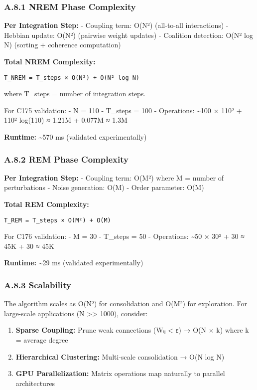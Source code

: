 \documentclass[
]{article}
\providecommand{\tightlist}{%
  \setlength{\itemsep}{0pt}\setlength{\parskip}{0pt}}
\begin{document}
\subsubsection{A.8.1 NREM Phase
Complexity}\label{a.8.1-nrem-phase-complexity}

\textbf{Per Integration Step:} - Coupling term: O(N²) (all-to-all
interactions) - Hebbian update: O(N²) (pairwise weight updates) -
Coalition detection: O(N² log N) (sorting + coherence computation)

\textbf{Total NREM Complexity:}

\begin{verbatim}
T_NREM = T_steps × O(N²) + O(N² log N)
\end{verbatim}

where T\_steps = number of integration steps.

For C175 validation: - N = 110 - T\_steps = 100 - Operations:
\textasciitilde100 × 110² + 110² log(110) ≈ 1.21M + 0.077M ≈ 1.3M

\textbf{Runtime:} \textasciitilde570 ms (validated experimentally)

\subsubsection{A.8.2 REM Phase
Complexity}\label{a.8.2-rem-phase-complexity}

\textbf{Per Integration Step:} - Coupling term: O(M²) where M = number
of perturbations - Noise generation: O(M) - Order parameter: O(M)

\textbf{Total REM Complexity:}

\begin{verbatim}
T_REM = T_steps × O(M²) + O(M)
\end{verbatim}

For C176 validation: - M = 30 - T\_steps = 50 - Operations:
\textasciitilde50 × 30² + 30 ≈ 45K + 30 ≈ 45K

\textbf{Runtime:} \textasciitilde29 ms (validated experimentally)

\subsubsection{A.8.3 Scalability}\label{a.8.3-scalability}

The algorithm scales as O(N²) for consolidation and O(M²) for
exploration. For large-scale applications (N \textgreater\textgreater{}
1000), consider:

\begin{enumerate}
\def\labelenumi{\arabic{enumi}.}
\tightlist
\item
  \textbf{Sparse Coupling:} Prune weak connections (Wᵢⱼ \textless{} ε) →
  O(N × k) where k = average degree
\item
  \textbf{Hierarchical Clustering:} Multi-scale consolidation → O(N log
  N)
\item
  \textbf{GPU Parallelization:} Matrix operations map naturally to
  parallel architectures
\end{enumerate}
\end{document}
